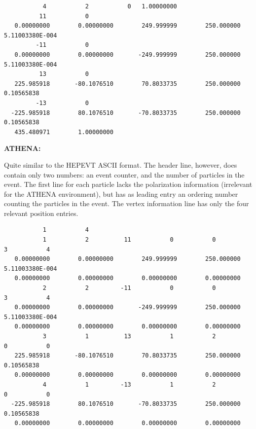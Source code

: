 \documentclass[12pt]{book}
\begin{document}
\begin{scriptsize}
  \begin{verbatim}
           4           2           0   1.00000000
          11           0
   0.00000000        0.00000000        249.999999        250.000000       5.11003380E-004
         -11           0
   0.00000000        0.00000000       -249.999999        250.000000       5.11003380E-004
          13           0
   225.985918       -80.1076510        70.8033735        250.000000       0.10565838
         -13           0
  -225.985918        80.1076510       -70.8033735        250.000000       0.10565838
   435.480971        1.00000000
  \end{verbatim}
\end{scriptsize}

{\bf ATHENA:}

Quite similar to the HEPEVT ASCII format. The header line, however,
does contain only two numbers: an event counter, and the number of
particles in the event. The first line for each particle lacks the
polarization information (irrelevant for the ATHENA environment), but
has as leading entry an ordering number counting the particles in the
event. The vertex information line has only the four relevant position
entries. 


\begin{scriptsize}
  \begin{verbatim}
           1           4          
           1           2          11           0           0           3           4          
   0.00000000        0.00000000        249.999999        250.000000       5.11003380E-004
   0.00000000        0.00000000        0.00000000        0.00000000      
           2           2         -11           0           0           3           4          
   0.00000000        0.00000000       -249.999999        250.000000       5.11003380E-004
   0.00000000        0.00000000        0.00000000        0.00000000      
           3           1          13           1           2           0           0          
   225.985918       -80.1076510        70.8033735        250.000000       0.10565838
   0.00000000        0.00000000        0.00000000        0.00000000      
           4           1         -13           1           2           0           0          
  -225.985918        80.1076510       -70.8033735        250.000000       0.10565838
   0.00000000        0.00000000        0.00000000        0.00000000      
  \end{verbatim}
\end{scriptsize}
\end{document}
